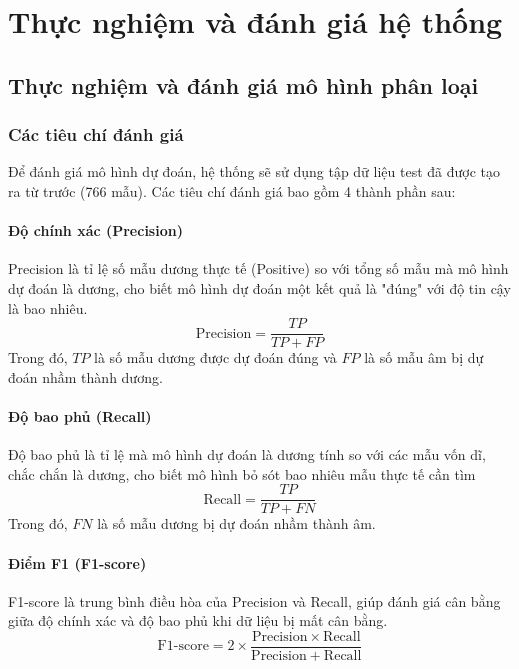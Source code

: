 \chapter{Thực nghiệm và đánh giá hệ thống}

\section{Thực nghiệm và đánh giá mô hình phân loại}
\subsection{Các tiêu chí đánh giá}
Để đánh giá mô hình dự đoán, hệ thống sẽ sử dụng tập dữ liệu test đã được tạo ra từ trước (766 mẫu). Các tiêu chí đánh giá bao gồm 4 thành phần sau:
\subsubsection{Độ chính xác (Precision)}
Precision là tỉ lệ số mẫu dương thực tế (Positive) so với tổng số mẫu mà mô hình dự đoán là dương, cho biết mô hình dự đoán một kết quả là "đúng" với độ tin cậy
là bao nhiêu.
\begin{equation}
	\mathrm{Precision} = \frac{TP}{TP + FP}
\end{equation}
Trong đó, $TP$ là số mẫu dương được dự đoán đúng và $FP$ là số mẫu âm bị dự đoán nhầm thành dương.

\subsubsection{Độ bao phủ (Recall)}
Độ bao phủ là tỉ lệ mà mô hình dự đoán là dương tính so với các mẫu vốn dĩ, chắc chắn là dương, cho biết mô hình bỏ sót bao nhiêu mẫu thực tế cần tìm
\begin{equation}
	\mathrm{Recall} = \frac{TP}{TP + FN}
\end{equation}
Trong đó, $FN$ là số mẫu dương bị dự đoán nhầm thành âm.

\subsubsection{Điểm F1 (F1-score)}
F1-score là trung bình điều hòa của Precision và Recall, giúp đánh giá cân bằng giữa độ chính xác và độ bao phủ khi dữ liệu bị mất cân bằng.
\begin{equation}
	\mathrm{F1\text{-}score} = 2 \times \frac{\mathrm{Precision} \times \mathrm{Recall}}{\mathrm{Precision} + \mathrm{Recall}}
\end{equation}

